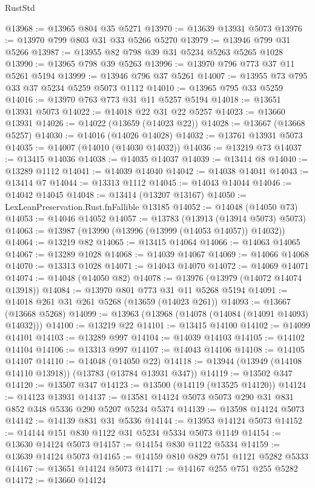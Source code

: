 \begin{lexlean}{RustStd}
\begin{coremodule}
@13968 := @13965 @804 @35 @5271
@13970 := @13639 @13931 @5073
@13976 := @13970 @799 @803 @31 @33 @5266 @5270
@13979 := @13946 @799 @31 @5266
@13987 := @13955 @82 @798 @39 @31 @5234 @5263 @5265 @1028
@13990 := @13965 @798 @39 @5263
@13996 := @13970 @796 @773 @37 @11 @5261 @5194
@13999 := @13946 @796 @37 @5261
@14007 := @13955 @73 @795 @33 @37 @5234 @5259 @5073 @1112
@14010 := @13965 @795 @33 @5259
@14016 := @13970 @763 @773 @31 @11 @5257 @5194
@14018 := @13651 @13931 @5073
@14022 := @14018 @22 @31 @22 @5257
@14023 := @13660 @13931
@14026 := @14022 (@13659 (@14023 @22))
@14028 := @13667 (@13668 @5257)
@14030 := @14016 (@14026 @14028)
@14032 := @13761 @13931 @5073
@14035 := @14007 (@14010 (@14030 @14032))
@14036 := @13219 @73
@14037 := @13415 @14036
@14038 := @14035 @14037
@14039 := @13414 @8
@14040 := @13289 @1112
@14041 := @14039 @14040
@14042 := @14038 @14041
@14043 := @13414 @7
@14044 := @13313 @1112
@14045 := @14043 @14044
@14046 := @14042 @14045
@14048 := @13414 (@13207 @13167)
@14050 := LexLeanPreservation.Rust.fnFallible @13185
@14052 := @14048 (@14050 @73)
@14053 := @14046 @14052
@14057 := @13783 (@13913 (@13914 @5073) @5073)
@14063 := @13987 (@13990 (@13996 (@13999 (@14053 @14057)) @14032))
@14064 := @13219 @82
@14065 := @13415 @14064
@14066 := @14063 @14065
@14067 := @13289 @1028
@14068 := @14039 @14067
@14069 := @14066 @14068
@14070 := @13313 @1028
@14071 := @14043 @14070
@14072 := @14069 @14071
@14074 := @14048 (@14050 @82)
@14078 := @13976 (@13979 (@14072 @14074 @13918))
@14084 := @13970 @801 @773 @31 @11 @5268 @5194
@14091 := @14018 @261 @31 @261 @5268 (@13659 (@14023 @261))
@14093 := @13667 (@13668 @5268)
@14099 := @13963 (@13968 (@14078 (@14084 (@14091 @14093) @14032)))
@14100 := @13219 @22
@14101 := @13415 @14100
@14102 := @14099 @14101
@14103 := @13289 @997
@14104 := @14039 @14103
@14105 := @14102 @14104
@14106 := @13313 @997
@14107 := @14043 @14106
@14108 := @14105 @14107
@14110 := @14048 (@14050 @22)
@14118 := @13944 (@13949 (@14108 @14110 @13918)) (@13783 (@13784 @13931 @347))
@14119 := @13502 @347
@14120 := @13507 @347
@14123 := @13500 (@14119 (@13525 @14120))
@14124 := @14123 @13931
@14137 := @13581 @14124 @5073 @5073 @290 @31 @831 @852 @348 @5336 @290 @5207 @5234 @5374
@14139 := @13598 @14124 @5073
@14142 := @14139 @831 @31 @5336
@14144 := @13953 @14124 @5073
@14152 := @14144 @151 @830 @1122 @31 @5234 @5334 @5073 @1149
@14154 := @13630 @14124 @5073
@14157 := @14154 @830 @1122 @5334
@14159 := @13639 @14124 @5073
@14165 := @14159 @810 @829 @751 @1121 @5282 @5333
@14167 := @13651 @14124 @5073
@14171 := @14167 @255 @751 @255 @5282
@14172 := @13660 @14124

\end{coremodule}
\end{lexlean}
